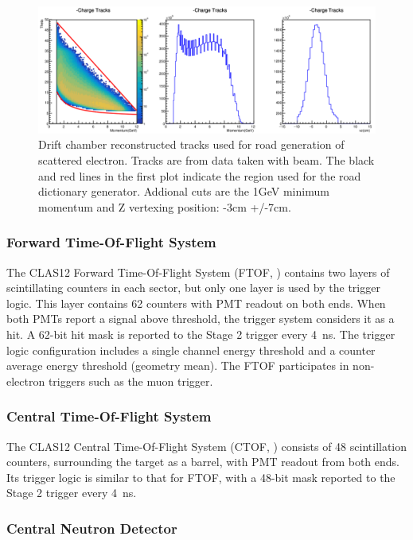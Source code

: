 \begin{figure}[hbt]
	\centering
	\includegraphics[width=1.0\columnwidth,keepaspectratio]{img/dc_roads_electrons_data.png}
	\caption{Drift chamber reconstructed tracks used for road generation of scattered electron. Tracks are from data taken with beam. The black and red lines in the first plot indicate the region used for the road dictionary generator. Addional cuts are the 1GeV minimum momentum and Z vertexing position: -3cm +/-7cm.}
	\label{fig:dc_roads_electrons_data}
\end{figure}

\subsubsection{Forward Time-Of-Flight System}

The CLAS12 Forward Time-Of-Flight System (FTOF, \cite{ftof-ref}) contains two layers of scintillating counters in each sector, but only one layer is used by the trigger logic. This layer contains 62 counters with PMT readout on both ends. When both PMTs report a signal above threshold, the trigger system considers it as a hit. A 62-bit hit mask is reported to the Stage 2 trigger every 4~ns. The trigger logic configuration includes a single channel energy threshold and a counter average energy threshold (geometry mean). The FTOF participates in non-electron triggers such as the muon trigger.


\subsubsection{Central Time-Of-Flight System}

The CLAS12 Central Time-Of-Flight System (CTOF, \cite{ctof-ref}) consists of 48 scintillation counters, surrounding the target as a barrel, with PMT readout from both ends. Its trigger logic is similar to that for FTOF, with a 48-bit mask reported to the Stage 2 trigger every 4~ns.


\subsubsection{Central Neutron Detector}

